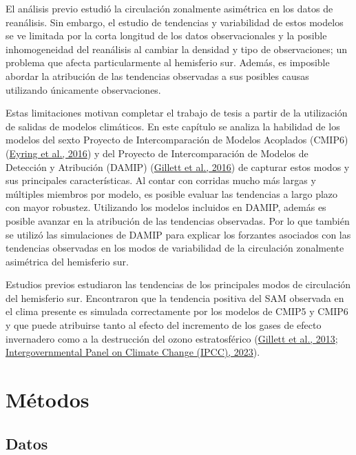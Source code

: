 \documentclass[12pt,oneside,a4paper]{reedthesis}
\begin{document}
El análisis previo estudió la circulación zonalmente asimétrica en los datos de reanálisis.
Sin embargo, el estudio de tendencias y variabilidad de estos modelos se ve limitada por la corta longitud de los datos observacionales y la posible inhomogeneidad del reanálisis al cambiar la densidad y tipo de observaciones; un problema que afecta particularmente al hemisferio sur.
Además, es imposible abordar la atribución de las tendencias observadas a sus posibles causas utilizando únicamente observaciones.

Estas limitaciones motivan completar el trabajo de tesis a partir de la utilización de salidas de modelos climáticos.
En este capítulo se analiza la habilidad de los modelos del sexto Proyecto de Intercomparación de Modelos Acoplados (CMIP6) (\protect\hyperlink{ref-eyring2016}{Eyring et al., 2016}) y del Proyecto de Intercomparación de Modelos de Detección y Atribución (DAMIP) (\protect\hyperlink{ref-gillett2016}{Gillett et al., 2016}) de capturar estos modos y sus principales características.
Al contar con corridas mucho más largas y múltiples miembros por modelo, es posible evaluar las tendencias a largo plazo con mayor robustez.
Utilizando los modelos incluidos en DAMIP, además es posible avanzar en la atribución de las tendencias observadas.
Por lo que también se utilizó las simulaciones de DAMIP para explicar los forzantes asociados con las tendencias observadas en los modos de variabilidad de la circulación zonalmente asimétrica del hemisferio sur.

Estudios previos estudiaron las tendencias de los principales modos de circulación del hemisferio sur.
Encontraron que la tendencia positiva del SAM observada en el clima presente es simulada correctamente por los modelos de CMIP5 y CMIP6 y que puede atribuirse tanto al efecto del incremento de los gases de efecto invernadero como a la destrucción del ozono estratosférico (\protect\hyperlink{ref-gillett2013}{Gillett et al., 2013}; \protect\hyperlink{ref-ipcc6ch3}{Intergovernmental Panel on Climate Change (IPCC), 2023}).

\hypertarget{muxe9todos-2}{%
\section{Métodos}\label{muxe9todos-2}}

\hypertarget{datos-3}{%
\subsection{Datos}\label{datos-3}}
\end{document}
